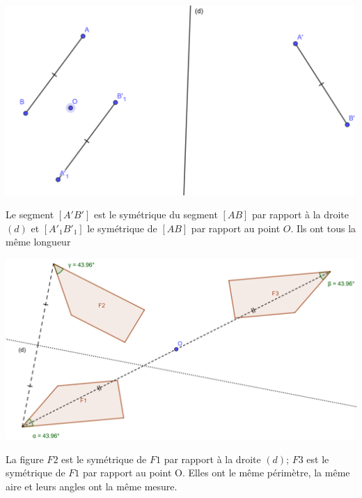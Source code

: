 \documentclass[12pt,a4paper]{article}
\begin{document}
\begin{myex}
	\begin{center}
		\includegraphics[scale=0.2]{sym_seg}
	\end{center}
	
	Le segment $[A'B']$ est le symétrique du segment $[AB]$ par rapport à la droite $(d)$ et $[A'_1B'_1]$ le symétrique de $[AB]$ par rapport au point $O$. 
	Ils ont tous la même longueur
	
	
\end{myex}	

\begin{myex}
	\begin{center}
		\includegraphics[scale=0.2]{sym_figures}
	\end{center}
	
	La figure $F2$ est le symétrique de $F1$ par rapport à la droite $(d)$; $F3$ est le symétrique de $F1$ par rapport au point O.
	Elles ont le même périmètre, la même aire et leurs angles ont la même mesure.
\end{myex}
\end{document}
